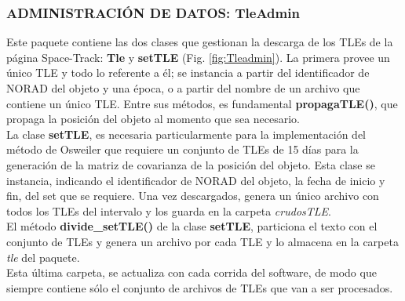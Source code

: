 \subsubsection*{ADMINISTRACI\'ON DE DATOS: TleAdmin}
Este paquete contiene las dos clases que gestionan la descarga de los TLEs de la p\'agina Space-Track: {\bf{Tle}} y {\bf{setTLE}} (Fig. \ref{fig:Tleadmin}). La primera provee un \'unico TLE y todo lo referente a \'el; se instancia a partir del identificador de NORAD del objeto y una \'epoca, o a partir del nombre de un archivo que contiene un \'unico TLE. Entre sus m\'etodos, es fundamental {\bf{propagaTLE()}}, que propaga la posici\'on del objeto al momento que sea necesario.\\

La clase {\bf{setTLE}}, es necesaria particularmente para la implementaci\'on del m\'etodo de Osweiler que requiere un conjunto de TLEs de 15 d\'ias para la generaci\'on de la matriz de covarianza de la posici\'on del objeto. Esta clase se instancia, indicando el identificador de NORAD del objeto, la fecha de inicio y fin, del set que se requiere. Una vez descargados, genera un \'unico archivo con todos los TLEs del intervalo y los guarda en la carpeta {\it{crudosTLE}}.\\
El m\'etodo {\bf{divide\_setTLE()}} de la clase {\bf{setTLE}}, particiona el texto con el conjunto de TLEs y genera un archivo por cada TLE y lo almacena en la carpeta {\it{tle}} del paquete.\\
Esta \'ultima carpeta, se actualiza con cada corrida del software, de modo que siempre contiene s\'olo el conjunto de archivos de TLEs que van a ser procesados.\\

